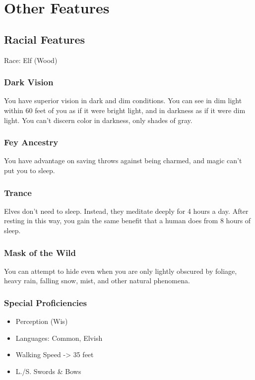 \documentclass[10pt,twoside,twocolumn,openany]{book}
\begin{document}

	


\chapter{Other Features}
\section{Racial Features}
\begin{commentbox}{}
	Race: Elf (Wood) 
\end{commentbox}
	\subsection{Dark Vision}
		You have superior vision in dark and dim conditions. You can see in dim light within 60 feet of you as if it were bright light, and in darkness as if it were dim light. You can't discern color in darkness, only shades of gray.
	\subsection{Fey Ancestry} 
		\hypertarget{FA}{You have advantage on saving throws against being charmed, and magic can't put you to sleep.}
	\subsection{Trance}
		\hypertarget{trance}{Elves don't need to sleep. Instead, they meditate deeply for 4 hours a day. After resting in this way, you gain the same benefit that a human does from 8 hours of sleep.}
	\subsection{Mask of the Wild}
		\hypertarget{mask}{You can attempt to hide even when you are only lightly obscured by foliage, heavy rain, falling snow, mist, and other natural phenomena.}
	\subsection{Special Proficiencies}
	\begin{itemize}
		\item Perception (Wis)
		\item Languages: Common, Elvish
		\item Walking Speed -> 35 feet
		\item L./S. Swords \& Bows
	\end{itemize}
		
\end{document}
